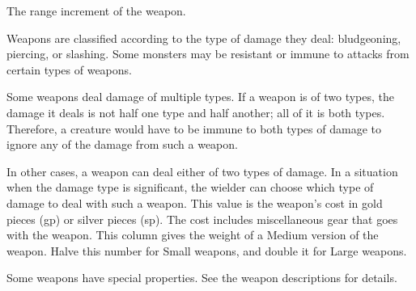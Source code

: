  The range increment of the weapon.

 Weapons are classified according to the type of damage they deal: bludgeoning, piercing, or slashing. Some monsters may be resistant or immune to attacks from certain types of weapons.

Some weapons deal damage of multiple types. If a weapon is of two types, the damage it deals is not half one type and half another; all of it is both types. Therefore, a creature would have to be immune to both types of damage to ignore any of the damage from such a weapon.

In other cases, a weapon can deal either of two types of damage. In a situation when the damage type is significant, the wielder can choose which type of damage to deal with such a weapon.
 This value is the weapon's cost in gold pieces (gp) or silver pieces (sp). The cost includes miscellaneous gear that goes with the weapon.
 This column gives the weight of a Medium version of
the weapon. Halve this number for Small weapons, and double it for Large weapons.

 Some weapons have special properties. See the weapon
descriptions for details.

